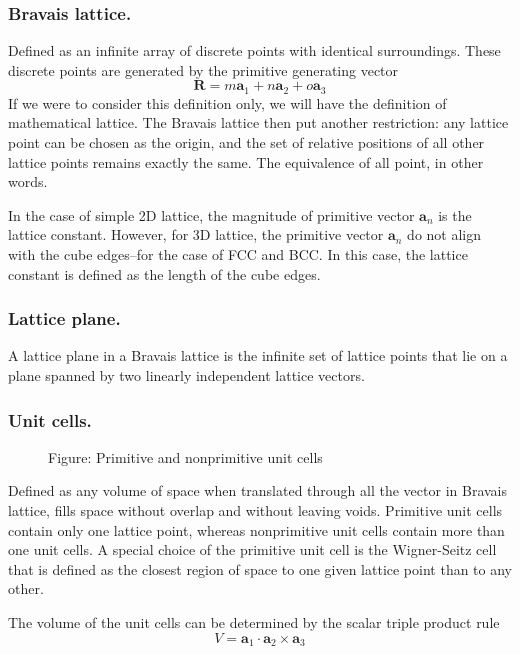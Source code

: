 \documentclass[../../../main.tex]{subfiles}
\begin{document}
\subsubsection{Bravais lattice.}
Defined as an infinite array of discrete points with identical surroundings.
These discrete points are generated by the primitive generating vector
\begin{equation*}
    \mathbf{R} =m \mathbf{a }_1+n \mathbf{a }_2 +o \mathbf{a }_3
\end{equation*}
If we were to consider this definition only, we will have the definition of mathematical lattice.
The Bravais lattice then put another restriction: any lattice point can be chosen as the origin, and the set of relative positions of all other lattice points remains exactly the same.
The equivalence of all point, in other words.

In the case of simple 2D lattice, the magnitude of primitive vector $\mathbf{a }_n$ is the lattice constant.
However, for 3D lattice, the primitive vector $\mathbf{a }_n$ do not align with the cube edges--for the case of FCC and BCC.
In this case, the lattice constant is defined as the length of the cube edges.

\subsubsection{Lattice plane.}
A lattice plane in a Bravais lattice is the infinite set of lattice points that lie on a plane spanned by two linearly independent lattice vectors.

\subsubsection{Unit cells.}
\begin{figure}[b]
    \centering
    \caption*{Figure: Primitive and nonprimitive unit cells}
\end{figure}
Defined as any volume of space when translated through all the vector in Bravais lattice, fills space without overlap and without leaving voids.
Primitive unit cells contain only one lattice point, whereas nonprimitive unit cells contain more than  one unit cells.
A special choice of the primitive unit cell is the
Wigner-Seitz cell that is defined as the closest region of space to one given lattice point than to any other.

The volume of the unit cells can be determined by the scalar triple product rule
\begin{equation*}
    V=\mathbf{a}_1 \cdot \mathbf{a }_2 \times \mathbf{a }_3
\end{equation*}
\end{document}
